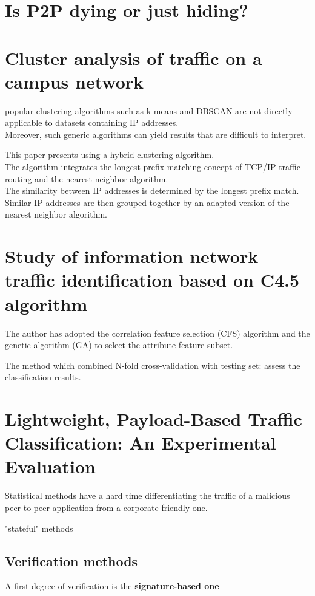 \documentclass{article}
\begin{document}
\section{Is P2P dying or just hiding?}

\section{Cluster analysis of traffic on a campus network}
popular clustering algorithms such as k-means and DBSCAN are not directly applicable to datasets containing IP addresses. \\
Moreover, such generic algorithms can yield results that are difficult to interpret. 

This paper presents using a hybrid clustering algorithm.\\
The algorithm integrates the longest prefix matching concept of TCP/IP traffic routing and the nearest neighbor algorithm.\\
The similarity between IP addresses is determined by the longest prefix match. 
Similar IP addresses are then grouped together by an adapted version of the nearest neighbor algorithm.

\section{Study of information network traffic identification based on C4.5 algorithm}
The author has adopted the correlation feature selection (CFS) algorithm and the genetic algorithm (GA) to select the attribute feature subset. 

The method which combined N-fold cross-validation with testing set: assess the classification results.

\section{Lightweight, Payload-Based Traffic Classification: An Experimental Evaluation}
Statistical methods have a hard time differentiating the traffic of a malicious peer-to-peer application from a corporate-friendly one.

"stateful" methods

\subsection{Verification methods}
A first degree of verification is the \textbf{signature-based one}
\end{document}
